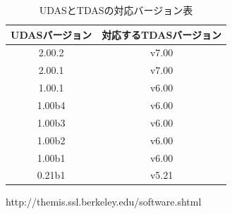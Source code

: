 \documentclass[a4j]{jbook}
\begin{document}
\begin{table}[H]
\begin{center}
\caption{UDASとTDASの対応バージョン表}
\label{versions}
{\small
\begin{tabular}{c|c}\hline
UDASバージョン & 対応するTDASバージョン \\ \hline
{\color{red}2.00.2} & {\color{red}v7.00}\\
2.00.1 & v7.00\\
1.00.1 & v6.00\\
1.00b4 & v6.00\\
1.00b3 & v6.00\\
1.00b2 & v6.00\\
1.00b1 & v6.00\\
{\color{blue}0.21b1} & {\color{blue}v5.21}\\ \hline
\end{tabular}
}
\end{center}
\end{table}

\begin{thebibliography}{1}
 http://themis.ssl.berkeley.edu/software.shtml
\end{thebibliography}
\end{document}
